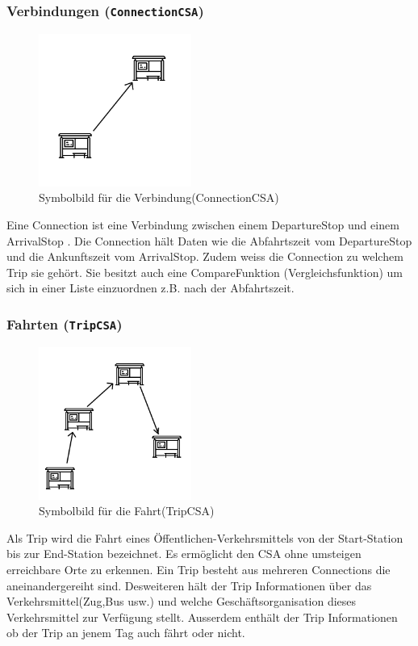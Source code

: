 \subsubsection{Verbindungen (\texttt{ConnectionCSA})}
\begin{figure}[htb]
	\centering
	\includegraphics[width=5cm]{img/connection.png}
	\caption{Symbolbild für die Verbindung(ConnectionCSA)}
	\label{fig:connection}
\end{figure}
Eine Connection ist eine Verbindung zwischen einem DepartureStop und einem ArrivalStop . Die Connection hält Daten wie die Abfahrtszeit vom DepartureStop und die Ankunftszeit vom ArrivalStop. Zudem weiss die Connection zu welchem Trip sie gehört. Sie besitzt auch eine CompareFunktion (Vergleichsfunktion) um sich in einer Liste einzuordnen z.B. nach der Abfahrtszeit.

\subsubsection{Fahrten (\texttt{TripCSA})}
\begin{figure}[htb]
	\centering
	\includegraphics[width=5cm]{img/trip.png}
	\caption{Symbolbild für die Fahrt(TripCSA)}
	\label{fig:trip}
\end{figure}
Als Trip wird die Fahrt eines Öffentlichen-Verkehrsmittels von der Start-Station bis zur End-Station bezeichnet. Es ermöglicht den CSA ohne umsteigen erreichbare Orte zu erkennen. Ein Trip besteht aus mehreren Connections die aneinandergereiht sind. Desweiteren hält der Trip Informationen über das Verkehrsmittel(Zug,Bus usw.) und welche Geschäftsorganisation dieses Verkehrsmittel zur Verfügung stellt. Ausserdem enthält der Trip Informationen ob der Trip an jenem Tag auch fährt oder nicht.


